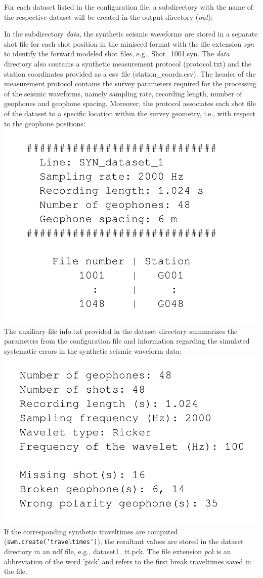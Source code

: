 \documentclass[a4paper,fleqn]{cas-sc}
\begin{document}
For each dataset listed in the configuration file, a subdirectory with the name of the respective dataset will be created in the output directory (\textit{out}):

In the subdirectory \textit{data}, the synthetic seismic waveforms are stored in a separate shot file for each shot position in the miniseed format \citep{ahern2012, ringler2015} with the file extension \textit{syn} to identify the forward modeled shot files, e.g., Shot\_1001.syn. 
The \textit{data} directory also contains a synthetic measurement protocol (protocol.txt) and the station coordinates provided as a csv file (station\_coords.csv). The header of the measurement protocol contains the survey parameters required for the processing of the seismic waveforms, namely sampling rate, recording length, number of geophones and geophone spacing. Moreover, the protocol associates each shot file of the dataset to a specific location within the survey geometry, i.e., with respect to the geophone positions:
\newline
\includegraphics[width=.3\textwidth]{./figures/protocol.pdf}
\newline
The auxiliary file info.txt provided in the dataset directory summarizes the parameters from the configuration file and information regarding the simulated systematic errors in the synthetic seismic waveform data:
\newline
\includegraphics[width=.3\textwidth]{./figures/info.pdf}
\newline
If the corresponding synthetic traveltimes are computed (\texttt{swm.create('traveltimes')}), the resultant values are stored in the dataset directory in an udf file, e.g., dataset1\_tt.pck. The file extension \textit{pck} is an abbreviation of the word 'pick' and refers to the first break traveltimes saved in the file.
\end{document}
